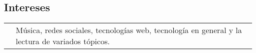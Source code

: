 \documentclass[letterpaper, oneside, final, 12pt]{scrartcl}
\begin{document}
\begin{center}
\section{Intereses}

\begin{tabularx}{0.97\linewidth}{>{\raggedleft\scshape}p{2.5cm}X}

					& M\'usica, redes sociales, tecnolog\'ias web, tecnolog\'ia en general y la lectura de variados t\'opicos. \\

\end{tabularx}


\end{center}
\end{document}
